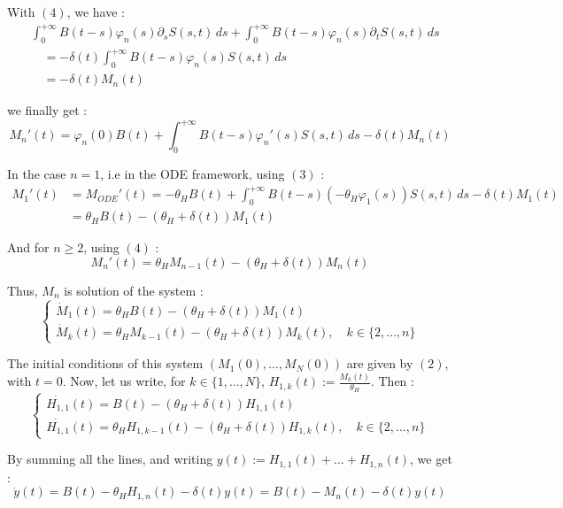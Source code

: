 \documentclass[12pt,a4paper,onecolumn]{article}
\begin{document}
With $(4)$, we have :
\begin{align*}
&\int_0^{+\infty} B(t-s)\varphi_n(s) \partial_s S(s,t) \, ds  + \int_0^{+\infty} B(t-s)\varphi_n(s) \partial_t S(s,t) \, ds \\
&\quad = - \delta(t) \int_0^{+\infty} B(t-s)\varphi_n(s) S(s,t)  \, ds \\
&\quad = - \delta(t) M_n(t)
\end{align*}

we finally get :
\[
M_n'(t) = \varphi_n(0) B(t) + \int_0^{+\infty} B(t-s)\varphi_n'(s) S(s,t) \, ds - \delta(t) M_n(t)
\]

In the case $n = 1$, i.e in the ODE framework, using $(3)$ : 
\begin{align*}
M_{1}'(t) &= M_{ODE}'(t)= -\theta_H B(t) + \int_0^{+\infty} B(t-s)(-\theta_H \varphi_1(s)) S(s,t) \, ds - \delta(t) M_1(t) \\
&= \theta_H B(t) - (\theta_H + \delta(t)) M_1(t)
\end{align*}

And for $n \geq 2$, using $(4)$  :
\[
M_n'(t) = \theta_H M_{n-1}(t) - (\theta_H + \delta(t)) M_n(t)
\]

Thus, \(M_n\) is solution of the system :
\begin{equation}
\begin{cases}
\dot{M}_1(t) = \theta_H B(t) - (\theta_H + \delta(t)) M_1(t) \\
\dot{M}_k(t) = \theta_H M_{k-1}(t) - (\theta_H + \delta(t)) M_k(t), \quad k \in \{2, \dots, n\}
\end{cases}
\end{equation}

The initial conditions of this system  $(M_1(0), \dots, M_N(0))$ are given by $(2)$, with $t = 0$.
Now, let us write, for \(k \in \{1, \dots, N\}\), $H_{1,k}(t) := \frac{M_k(t)}{\theta_H}$. Then : 
\begin{equation}
\begin{cases}
\dot{H_{1,1}}(t) = B(t) - (\theta_H + \delta(t)) H_{1,1}(t) \\
\dot{H_{1,1}}(t) = \theta_H H_{1, k-1}(t) - (\theta_H + \delta(t)) H_{1,k}(t), \quad k \in \{2, \dots, n\}
\end{cases}
\end{equation}

By summing all the lines, and writing $y(t) := H_{1,1}(t) + \dots + H_{1,n}(t)$, we get :
\[
\dot{y}(t) = B(t) - \theta_H H_{1,n}(t) - \delta(t) y(t) = B(t) - M_n(t) - \delta(t) y(t)
\]
\end{document}
